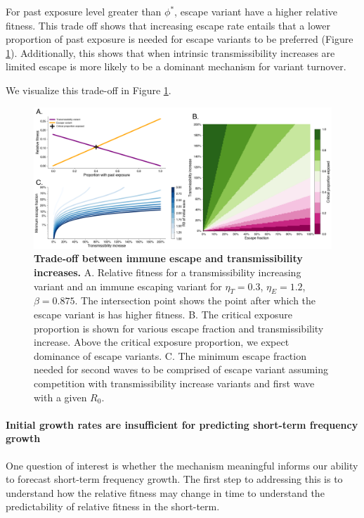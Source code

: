 \documentclass[12pt,oneside,letterpaper]{article}
\begin{document}
For past exposure level greater than $\phi^{*}$, escape variant have a higher relative fitness.
This trade off shows that increasing escape rate entails that a lower proportion of past exposure is needed for escape variants to be preferred (Figure \ref{fig:transmission_tradeoff}).
Additionally, this shows that when intrinsic transmissibility increases are limited escape is more likely to be a dominant mechanism for variant turnover.

We visualize this trade-off in Figure \ref{fig:transmission_tradeoff}.

\begin{figure}[h]
    \centering
    \includegraphics[width=0.8\linewidth]{./figures/transmission_tradeoff.png}
    \caption{\textbf{Trade-off between immune escape and transmissibility increases.}
    A. Relative fitness for a transmissibility increasing variant and an immune escaping variant for $\eta_{T}=0.3$, $\eta_{E}=1.2$, $\beta=0.875$.
    The intersection point shows the point after which the escape variant is has higher fitness.
    B. The critical exposure proportion is shown for various escape fraction and transmissibility increase. Above the critical exposure proportion, we expect dominance of escape variants.
    C. The minimum escape fraction needed for second waves to be comprised of escape variant assuming competition with transmissibility increase variants and first wave with a given $R_{0}$.}
    \label{fig:transmission_tradeoff}
\end{figure}

\paragraph{Initial growth rates are insufficient for predicting short-term frequency growth}%

One question of interest is whether the mechanism meaningful informs our ability to forecast short-term frequency growth.
The first step to addressing this is to understand how the relative fitness may change in time to understand the predictability of relative fitness in the short-term.
\end{document}
